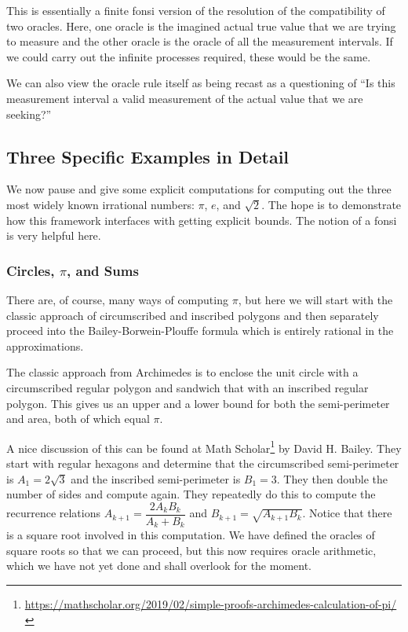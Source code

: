 \documentclass[12pt]{article}
\begin{document}
This is essentially a finite fonsi version of the resolution of the compatibility of two oracles. Here, one oracle is the imagined actual true value that we are trying to measure and the other oracle is the oracle of all the measurement intervals. If we could carry out the infinite processes required, these would be the same. 

We can also view the oracle rule itself as being recast as a questioning of ``Is this measurement interval a valid measurement of the actual value that we are seeking?''

\subsection{Three Specific Examples in Detail}


We now pause and give some explicit computations for computing out the three most widely known irrational numbers: $\pi$, $e$, and $\sqrt{2}$. The hope is to demonstrate how this framework interfaces with getting explicit bounds. The notion of a fonsi is very helpful here. 

\subsubsection{Circles, \texorpdfstring{$\pi$}{pi}, and Sums}

There are, of course, many ways of computing $\pi$, but here we will start with the classic approach of circumscribed and inscribed polygons and then separately proceed into the Bailey-Borwein-Plouffe formula which is entirely rational in the approximations. 

The classic approach from Archimedes is to enclose the unit circle with a circumscribed regular polygon and sandwich that with an inscribed regular polygon. This gives us an upper and a lower bound for both the semi-perimeter and area, both of which equal $\pi$. 

A nice discussion of this can be found at Math Scholar\footnote{\url{https://mathscholar.org/2019/02/simple-proofs-archimedes-calculation-of-pi/}} by David H. Bailey. They start with regular hexagons and determine that the circumscribed semi-perimeter is $A_1 = 2 \sqrt{3}$ and the inscribed semi-perimeter is $B_1 = 3$. They then double the number of sides and compute again. They repeatedly do this to compute the recurrence relations $A_{k+1} = \dfrac{2A_k B_k}{A_k + B_k}$ and $B_{k+1} = \sqrt{A_{k+1}B_k}$. Notice that there is a square root involved in this computation. We have defined the oracles of square roots so that we can proceed, but this now requires oracle arithmetic, which we have not yet done and shall overlook for the moment.  
\end{document}
